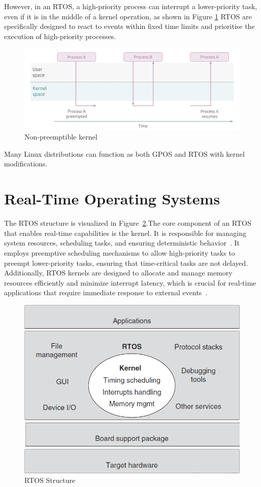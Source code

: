 \documentclass[MMR,Master,english]{twbook}
\begin{document}
\noindent However, in an RTOS, a high-priority process can interrupt a lower-priority task, even if it is in the middle of a kernel operation, as shown in Figure \ref{fig:kernel_rt} RTOS are specifically designed to react to events within fixed time limits and prioritise the execution of high-priority processes.

\begin{figure}[H]
	\centering
	\includegraphics[width=0.75\columnwidth]{img/introduction/kernel_rt.png}
	\caption[Non-preemptible kernel]{Non-preemptible kernel~\cite{WhatRealtimeLinuxa}}
	\label{fig:kernel_rt}
\end{figure}

\noindent Many Linux distributions can function as both GPOS and RTOS with kernel modifications.

\section{Real-Time Operating Systems}
\noindent The RTOS structure is visualized in Figure~\ref{fig:rtos_structure}.The core component of an RTOS that enables real-time capabilities is the kernel. It is responsible for managing system resources, scheduling tasks, and ensuring deterministic behavior~\cite{malallahComprehensiveStudyKernel2021}. It employs preemptive scheduling mechanisms to allow high-priority tasks to preempt lower-priority tasks, ensuring that time-critical tasks are not delayed. Additionally, RTOS kernels are designed to allocate and manage memory resources efficiently and minimize interrupt latency, which is crucial for real-time applications that require immediate response to external events~\cite{wangRealtimeEmbeddedSystems2017}.

\begin{figure}[H]
	\centering
	\includegraphics[width=0.50\columnwidth]{img/introduction/rtos_structure.png}
	\caption[RTOS Structure]{RTOS Structure~\cite{wangRealtimeEmbeddedSystems2017}}
	\label{fig:rtos_structure}
\end{figure}
\end{document}
